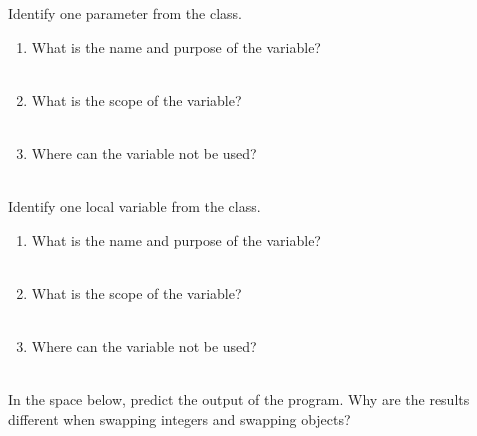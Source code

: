 \Q Identify one parameter from the  class.
\begin{enumerate}
\item What is the name and purpose of the variable? \\[2pt]
 \\[-2em]

\item What is the scope of the variable? \\[2pt]
 \\[-2em]

\item Where can the variable not be used? \\[2pt]
 \\[-2em]
\end{enumerate}


\Q Identify one local variable from the  class.
\begin{enumerate}
\item What is the name and purpose of the variable? \\[2pt]
 \\[-2em]

\item What is the scope of the variable? \\[2pt]
 \\[-2em]

\item Where can the variable not be used? \\[2pt]
 \\[-2em]
\end{enumerate}


\Q \label{predict}
In the space below, predict the output of the  program.
Why are the results different when swapping integers and swapping objects?

